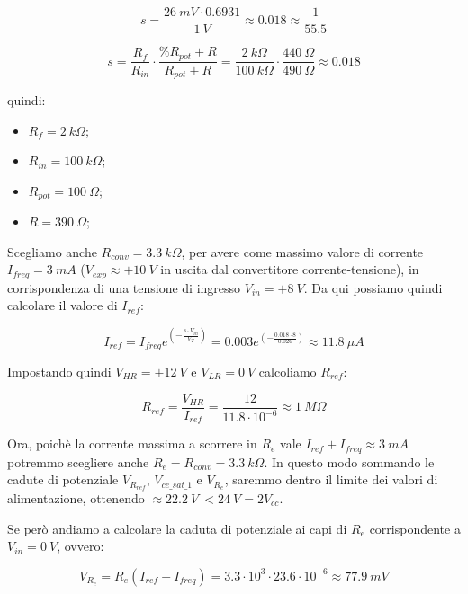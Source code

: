 \begin{equation}\label{s2}
    s=\frac{26\ mV\cdot 0.6931}{1\ V}\approx0.018\approx\frac{1}{55.5}
\end{equation}

\begin{equation}\label{s3}
    s=\frac{R_f}{R_{in}}\cdot\frac{\%R_{pot}+R}{R_{pot}+R}
    =\frac{2\ k\Omega}{100\ k\Omega}\cdot\frac{440\ \Omega}{490\ \Omega}
    \approx 0.018
\end{equation}

quindi:

\begin{itemize}
    \item $R_f = 2\ k\Omega$;
    \item $R_{in} = 100\ k\Omega$;
    \item $R_{pot} = 100\ \Omega$;
    \item $R = 390\ \Omega$;
\end{itemize}

Scegliamo anche $R_{conv}=3.3\ k\Omega$, per avere come massimo valore di corrente
$I_{freq} = 3\ mA$ ($V_{exp}\approx+10\ V$ in uscita dal convertitore corrente-tensione),
in corrispondenza di una tensione di ingresso $V_{in}=+8\ V$. Da qui possiamo quindi calcolare
il valore di $I_{ref}$:

\begin{equation}\label{iref_calc}
    I_{ref}=I_{freq}e^{\left(-\frac{s\cdot V_{in}}{V_T}\right)}
    =0.003e^{\left(-\frac{0.018\cdot8}{0.026}\right)}
    \approx11.8\ \mu A
\end{equation}

Impostando quindi $V_{HR}=+12\ V$ e $V_{LR}=0\ V$ calcoliamo $R_{ref}$:

\begin{equation}\label{rref_calc}
    R_{ref}=\frac{V_{HR}}{I_{ref}}=\frac{12}{11.8\cdot10^{-6}}\approx 1\ M\Omega
\end{equation}

Ora, poichè la corrente massima a scorrere in $R_e$ vale $I_{ref}+I_{freq}\approx3\ mA$
potremmo scegliere anche $R_e=R_{conv}=3.3\ k\Omega$. In questo modo sommando le cadute di
potenziale $V_{R_{ref}}$, $V_{ce\_sat\_1}$ e $V_{R_e}$, saremmo dentro il limite dei valori
di alimentazione, ottenendo $\approx 22.2\ V\ < 24\ V= 2V_{cc}$.

Se però andiamo a calcolare la caduta di potenziale ai capi di $R_e$ corrispondente a $V_{in}=0\ V$,
ovvero:

\begin{equation}\label{vre}
    V_{R_e}=R_e(I_{ref}+I_{freq})=3.3\cdot10^3\cdot23.6\cdot10^{-6}\approx77.9\ mV
\end{equation}

